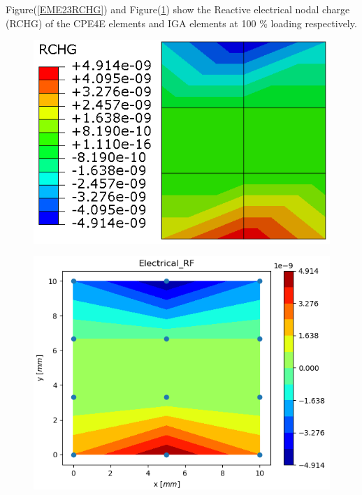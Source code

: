 \documentclass[11pt]{article}
\begin{document}
Figure(\ref{EME23RCHG}) and Figure(\ref{EME23RCHG_IGA}) show the Reactive electrical nodal charge (RCHG) of the CPE4E elements and IGA elements at 100 \% loading respectively. \\
\begin{figure}[H]
	\centering
	\begin{minipage}{.5\textwidth}
		\centering
		\includegraphics[width=1\linewidth]{EME23RCHG.png}
		\label{EME23RCHG}
	\end{minipage}%
	\begin{minipage}{.5\textwidth}
		\centering
		\includegraphics[width=1\linewidth]{EME23RCHG_IGA.png}
		\label{EME23RCHG_IGA}
	\end{minipage}
\end{figure}
\end{document}

